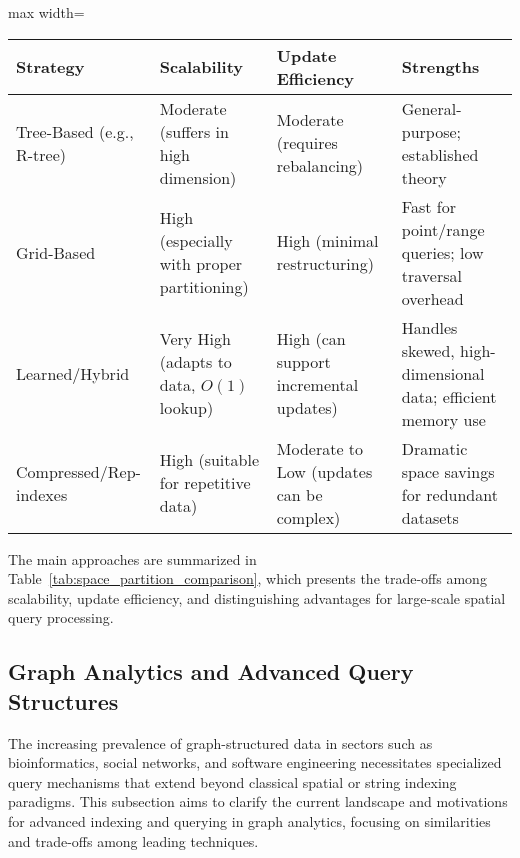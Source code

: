 \documentclass[sigconf]{acmart}
\begin{document}
\begin{table*}[htbp]
\centering
\caption{Comparison of Space-Partitioning Index Strategies for Large-Scale Query Processing}
\label{tab:space_partition_comparison}
\begin{adjustbox}{max width=\textwidth}
\begin{tabular}{@{}llll@{}}
\toprule
\textbf{Strategy} & \textbf{Scalability} & \textbf{Update Efficiency} & \textbf{Strengths} \\
\midrule
Tree-Based (e.g., R-tree) & Moderate (suffers in high dimension) & Moderate (requires rebalancing) & General-purpose; established theory \\
Grid-Based & High (especially with proper partitioning) & High (minimal restructuring) & Fast for point/range queries; low traversal overhead \\
Learned/Hybrid & Very High (adapts to data, $O(1)$ lookup) & High (can support incremental updates) & Handles skewed, high-dimensional data; efficient memory use \\
Compressed/Rep-indexes & High (suitable for repetitive data) & Moderate to Low (updates can be complex) & Dramatic space savings for redundant datasets \\
\bottomrule
\end{tabular}
\end{adjustbox}
\end{table*}

The main approaches are summarized in Table~\ref{tab:space_partition_comparison}, which presents the trade-offs among scalability, update efficiency, and distinguishing advantages for large-scale spatial query processing.

\subsection{Graph Analytics and Advanced Query Structures}

The increasing prevalence of graph-structured data in sectors such as bioinformatics, social networks, and software engineering necessitates specialized query mechanisms that extend beyond classical spatial or string indexing paradigms. This subsection aims to clarify the current landscape and motivations for advanced indexing and querying in graph analytics, focusing on similarities and trade-offs among leading techniques.
\end{document}

